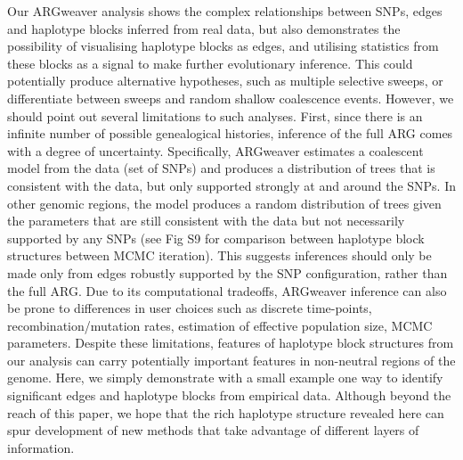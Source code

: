 \documentclass[twocolumn]{bmcart}%
\begin{document}
Our ARGweaver analysis shows the complex relationships between SNPs, edges and haplotype blocks inferred from real data, but also demonstrates the possibility of visualising haplotype blocks as edges, and utilising statistics from these blocks as a signal to make further evolutionary inference. This could potentially produce alternative hypotheses, such as multiple selective sweeps, or differentiate between sweeps and random shallow coalescence events. However, we should point out several limitations to such analyses. First, since there is an infinite number of possible genealogical histories, inference of the full ARG comes with a degree of uncertainty. Specifically, ARGweaver estimates a coalescent model from the data (set of SNPs) and produces a distribution of trees that is consistent with the data, but only supported strongly at and around the SNPs. In other genomic regions, the model produces a random distribution of trees given the parameters that are still consistent with the data but not necessarily supported by any SNPs (see Fig S9 for comparison between haplotype block structures between MCMC iteration). This suggests inferences should only be made only from edges robustly supported by the SNP configuration, rather than the full ARG. Due to its computational tradeoffs, ARGweaver inference can also be prone to differences in user choices such as discrete time-points, recombination/mutation rates, estimation of effective population size, MCMC parameters. Despite these limitations, features of haplotype block structures from our analysis can carry potentially important features in non-neutral regions of the genome. Here, we simply demonstrate with a small example one way to identify significant edges and haplotype blocks from empirical data. Although beyond the reach of this paper, we hope that the rich haplotype structure revealed here can spur development of new methods that take advantage of different layers of information. 
\end{document}

